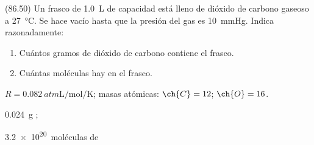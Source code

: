   \begin{exercise}[
      tags    = {},
      topics  = {química,química básica},
      source  = {FQ 1B MGH 2016, p86, e50},
    ]
    (86.50) Un frasco de \SI{1.0}{\liter} de capacidad está lleno de dióxido de carbono gaseoso a \SI{27}{\celsius}. Se hace vacío hasta que la presión del
    gas es \SI{10}{\mmHg}. Indica razonadamente:

    \begin{enumerate}
      \item Cuántos gramos de dióxido de carbono contiene el frasco.
      \item Cuántas moléculas hay en el frasco.
    \end{enumerate}

    \begin{gexdatos}
      \( R = \SI{0.082}{atm \liter\per\mole\per\kelvin} \); masas atómicas: \( \ch{C} = 12 \); \( \ch{O} = 16 \).
    \end{gexdatos}
  \end{exercise}

  \begin{solution}
    \begin{enumerate*}
      \item \SI{0.024}{\gram} ;
      \item \SI{3.2e20}{moléculas} de 
    \end{enumerate*}
  \end{solution}
